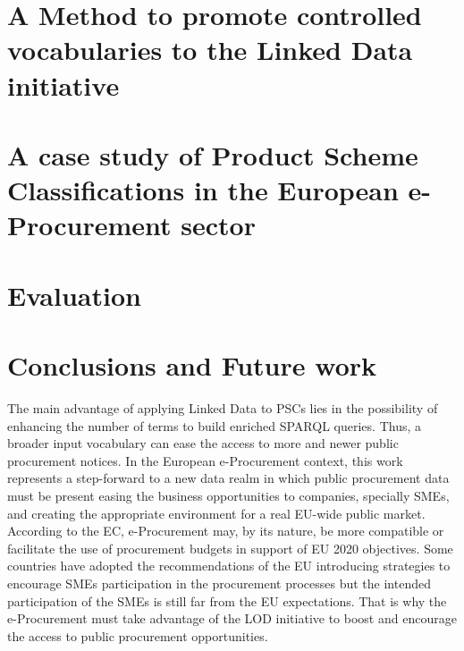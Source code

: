 \documentclass[preprint,12pt]{elsarticle}
\begin{document}
\section{A Method to promote controlled vocabularies to the Linked Data initiative}\label{sect:method}

\section{A case study of Product Scheme Classifications in the European e-Procurement sector}\label{sect:use-case}

\section{Evaluation}\label{sect:evaluation}

\section{Conclusions and Future work}\label{sect:conclusions}
The main advantage of applying Linked Data to PSCs lies in the possibility of enhancing the number of terms to 
build enriched SPARQL queries. Thus, a broader input vocabulary can ease the access to more and newer public procurement notices. 
In the European e-Procurement context, this work represents a step-forward to a new data realm in which 
public procurement data must be present easing the business opportunities to companies, specially SMEs, 
and creating the appropriate environment for a real EU-wide public market. According to the EC, e-Procurement may, 
by its nature, be more compatible or facilitate the use of procurement budgets in support of EU 2020 objectives. 
Some countries have adopted the recommendations of the EU introducing strategies to encourage SMEs 
participation in the procurement processes but the intended participation of the SMEs is still far from the EU expectations. 
That is why the e-Procurement must take advantage of the LOD initiative to boost and encourage the access to public procurement opportunities.
\end{document}
